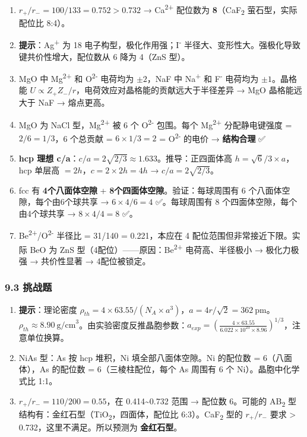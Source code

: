 \begin{enumerate}
\def\labelenumi{\arabic{enumi}.}
\setcounter{enumi}{5}
\item
  \(r_+/r_- = 100/133 = 0.752 > 0.732\) → Ca\textsuperscript{2+} 配位数为 \textbf{8}（CaF\textsubscript{2} 萤石型，实际配位比 8:4）。
\item
  \textbf{提示}：Ag\textsuperscript{+} 为 18 电子构型，极化作用强；I\textsuperscript{-} 半径大、变形性大。强极化导致键共价性增大，配位数从 6 降为 4（ZnS 型）。
\item
  MgO 中 Mg\textsuperscript{2+} 和 O\textsuperscript{2-} 电荷均为 \(\pm2\)，NaF 中 Na\textsuperscript{+} 和 F\textsuperscript{-} 电荷均为 \(\pm1\)。晶格能 \(U \propto Z_+Z_-/r\)，电荷效应对晶格能的贡献远大于半径差异 → MgO 晶格能远大于 NaF → 熔点更高。
\item
  MgO 为 NaCl 型，Mg\textsuperscript{2+} 被 6 个 O\textsuperscript{2-} 包围。每个 Mg\textsuperscript{2+} 分配静电键强度 = \(2/6 = 1/3\)，6 个总贡献 = \(6 \times 1/3 = 2\) = O\textsuperscript{2-} 的电价 → \textbf{结构合理} ✅
\item
  \textbf{hcp 理想 c/a}：\(c/a = 2\sqrt{2/3} \approx 1.633\)。推导：正四面体高 \(h = \sqrt{6}/3 \times a\)，hcp 单层高 \(= 2h\)，\(c = 2 \times 2h = 4h\) → \(c/a = 2\sqrt{2/3}\)。
\item
  fcc 有 \textbf{4个八面体空隙} + \textbf{8个四面体空隙}。验证：每球周围有 6 个八面体空隙，每个由6个球共享 → \(6 \times 4 / 6 = 4\) ✅。每球周围有 8 个四面体空隙，每个由4个球共享 → \(8 \times 4 / 4 = 8\) ✅。
\item
  Be\textsuperscript{2+}/O\textsuperscript{2-} 半径比 = 31/140 = 0.221，本应在 4 配位范围但非常接近下限。实际 BeO 为 ZnS 型（4配位）------原因：Be\textsuperscript{2+} 电荷高、半径极小 → 极化力极强 → 共价性显著 → 4配位被锁定。
\end{enumerate}

\subsubsection{9.3 挑战题}\label{ux6311ux6218ux9898-1}

\begin{enumerate}
\def\labelenumi{\arabic{enumi}.}
\setcounter{enumi}{12}
\item
  \textbf{提示}：理论密度 \(\rho_{th} = 4 \times 63.55 / (N_A \times a^3)\)，\(a = 4r/\sqrt{2} = 362\ \mathrm{pm}\)。\(\rho_{th} \approx 8.90\ \mathrm{g/cm}^3\)。由实验密度反推晶胞参数：\(a_{exp} = \left(\frac{4 \times 63.55}{6.022 \times 10^{23} \times 8.96}\right)^{1/3}\)，注意单位换算。
\item
  NiAs 型：As 按 hcp 堆积，Ni 填全部八面体空隙。Ni 的配位数 = 6（八面体），As 的配位数 = 6（三棱柱配位，每个 As 周围有 6 个 Ni）。晶胞中化学式比 1:1。
\item
  \(r_+/r_- = 110/200 = 0.55\)，在 0.414\textasciitilde0.732 范围 → 配位数 6。可能的 AB\textsubscript{2} 型结构有：金红石型（TiO\textsubscript{2}，四面体，配位比 6:3）。CaF\textsubscript{2} 型的 \(r_+/r_-\) 要求 \textgreater{} 0.732，这里不满足。所以预测为 \textbf{金红石型}。
\end{enumerate}

